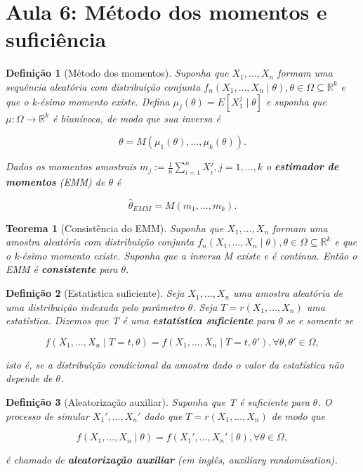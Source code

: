 \documentclass{article}
\newtheorem{theorem}{Teorema}
\newtheorem{definition}{Definição}
\begin{document}
\section*{Aula 6: Método dos momentos e suficiência}
\label{s6}
\begin{definition}[Método dos momentos]
Suponha que $X_1, \ldots, X_n$ formam uma sequência aleatória com distribuição conjunta $f_n (X_1, \ldots, X_n \mid \theta), \theta \in \Omega \subseteq \mathbb{R}^k$ e que o k-ésimo momento existe. Defina $\mu_j (\theta) = E[X_1^j \mid \theta]$ e suponha que $\mu: \Omega \rightarrow \mathbb{R}^k$ é biunívoca, de modo que sua inversa é

$$\theta = M(\mu_1(\theta), \ldots, \mu_k(\theta)).$$

Dados os momentos amostrais $m_j := \frac{1}{n} \sum_{i=1}^n X_i^j, j = 1, \ldots, k$ o \textbf{estimador de momentos} (EMM) de $\theta$ é

$$\hat{\theta}_{EMM} = M(m_1, \ldots, m_k).$$
\end{definition}

\begin{theorem}[Consistência do EMM]
Suponha que $X_1, \ldots, X_n$ formam uma amostra aleatória com distribuição conjunta  $f_n (X_1, \ldots, X_n \mid \theta), \theta \in \Omega \subseteq \mathbb{R}^k$ e que o k-ésimo momento existe. Suponha que a inversa M existe e é continua. Então o EMM é \textbf{consistente} para $\theta$.
\end{theorem}

\begin{definition}[Estatística suficiente]
Seja $X_1, \ldots, X_n$ uma amostra aleatória de uma distribuição indexada pelo parâmetro $\theta$. Seja $T = r(X_1, \ldots, X_n)$ uma estatística. Dizemos que T é uma \textbf{estatística suficiente} para $\theta$ se e somente se

\begin{equation}
    f(X_1, \ldots, X_n \mid T = t, \theta) = f(X_1, \ldots, X_n \mid T = t, \theta'), \forall \theta, \theta' \in \Omega,
\end{equation}

isto é, se a distribuição condicional da amostra dado o valor da estatística não depende de $\theta$.
\end{definition}

\begin{definition}[Aleatorização auxiliar]
 Suponha que T é suficiente para $\theta$. O processo de simular $X_1', \ldots, X_n'$ dado que $T = r(X_1, \ldots, X_n)$ de modo que 
 
 \begin{equation}
     f(X_1, \ldots, X_n \mid \theta) = f(X_1', \ldots, X_n' \mid \theta), \forall \theta \in \Omega,
 \end{equation}
 
 é chamado de \textbf{aleatorização auxiliar} (em inglês, auxiliary randomisation).
\end{definition}
\end{document}
